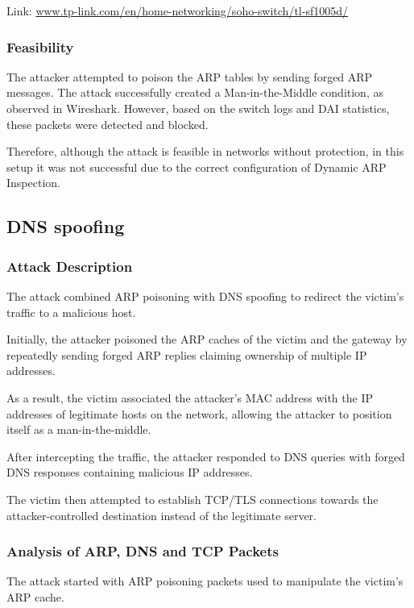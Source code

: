 \documentclass[12pt]{article}
\begin{document}
Link: \url{www.tp-link.com/en/home-networking/soho-switch/tl-sf1005d/}

\vspace{0.3cm}

\subsubsection{Feasibility}  
The attacker attempted to poison the ARP tables by sending forged ARP messages. The attack successfully created a Man-in-the-Middle condition, as observed in Wireshark. However, based on the switch logs and DAI statistics, these packets were detected and blocked.

Therefore, although the attack is feasible in networks without protection, in this setup it was not successful due to the correct configuration of Dynamic ARP Inspection.

\subsection{DNS spoofing}

\subsubsection{Attack Description}

The attack combined ARP poisoning with DNS spoofing
to redirect the victim's traffic to a malicious host.

Initially, the attacker poisoned the ARP caches
of the victim and the gateway by repeatedly sending
forged ARP replies claiming ownership of multiple IP addresses.

As a result, the victim associated the attacker's MAC address
with the IP addresses of legitimate hosts on the network,
allowing the attacker to position itself as a man-in-the-middle.

After intercepting the traffic, the attacker responded
to DNS queries with forged DNS responses containing
malicious IP addresses.

The victim then attempted to establish TCP/TLS connections
towards the attacker-controlled destination instead
of the legitimate server.

\subsubsection{Analysis of ARP, DNS and TCP Packets}

The attack started with ARP poisoning packets used
to manipulate the victim's ARP cache.
\end{document}
